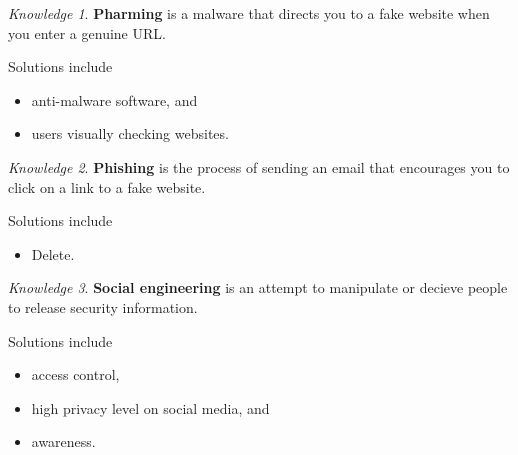 \documentclass[8pt]{article}
\theoremstyle{remark}
\newtheorem{knowledge}{Knowledge}[subsection]
\begin{document}
            \begin{knowledge}
                \textbf{Pharming} is a malware that directs you to a fake website when you enter a genuine URL.

                Solutions include
                \begin{itemize}
                    \item anti-malware software, and
                    \item users visually checking websites.
                \end{itemize}
            \end{knowledge}

            \begin{knowledge}
                \textbf{Phishing} is the process of sending an email that encourages you to click on a link to a fake website.

                Solutions include
                \begin{itemize}
                    \item Delete.
                \end{itemize}
            \end{knowledge}

            \begin{knowledge}
                \textbf{Social engineering} is an attempt to manipulate or decieve people to release security information.

                Solutions include
                \begin{itemize}
                    \item access control,
                    \item high privacy level on social media, and
                    \item awareness.
                \end{itemize}
            \end{knowledge}
\end{document}
